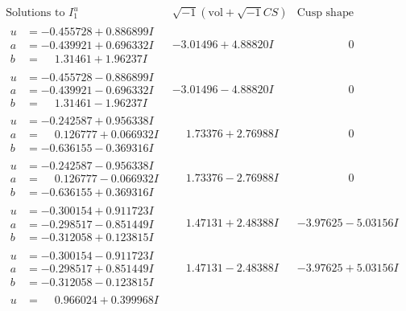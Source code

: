 \documentclass[1p]{elsarticle_modified}
\theoremstyle{definition}
\newcommand{\I}{\sqrt{-1}}
\begin{document}
$$\begin{array}{c|c|c}  
\text{Solutions to }I^u_{1}& \I (\text{vol} + \sqrt{-1}CS) & \text{Cusp shape}\\
 \hline 
\begin{aligned}
u &= -0.455728 + 0.886899 I \\
a &= -0.439921 + 0.696332 I \\
b &= \phantom{-}1.31461 + 1.96237 I\end{aligned}
 & -3.01496 + 4.88820 I & \phantom{-0.000000 } 0 \\ \hline\begin{aligned}
u &= -0.455728 - 0.886899 I \\
a &= -0.439921 - 0.696332 I \\
b &= \phantom{-}1.31461 - 1.96237 I\end{aligned}
 & -3.01496 - 4.88820 I & \phantom{-0.000000 } 0 \\ \hline\begin{aligned}
u &= -0.242587 + 0.956338 I \\
a &= \phantom{-}0.126777 + 0.066932 I \\
b &= -0.636155 - 0.369316 I\end{aligned}
 & \phantom{-}1.73376 + 2.76988 I & \phantom{-0.000000 } 0 \\ \hline\begin{aligned}
u &= -0.242587 - 0.956338 I \\
a &= \phantom{-}0.126777 - 0.066932 I \\
b &= -0.636155 + 0.369316 I\end{aligned}
 & \phantom{-}1.73376 - 2.76988 I & \phantom{-0.000000 } 0 \\ \hline\begin{aligned}
u &= -0.300154 + 0.911723 I \\
a &= -0.298517 - 0.851449 I \\
b &= -0.312058 + 0.123815 I\end{aligned}
 & \phantom{-}1.47131 + 2.48388 I & -3.97625 - 5.03156 I \\ \hline\begin{aligned}
u &= -0.300154 - 0.911723 I \\
a &= -0.298517 + 0.851449 I \\
b &= -0.312058 - 0.123815 I\end{aligned}
 & \phantom{-}1.47131 - 2.48388 I & -3.97625 + 5.03156 I \\ \hline\begin{aligned}
u &= \phantom{-}0.966024 + 0.399968 I \\

\end{aligned}
\end{array}$$
\end{document}
